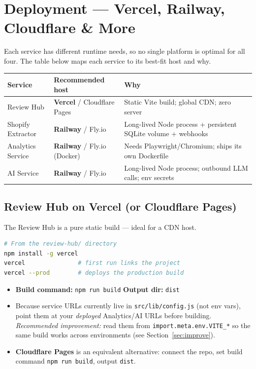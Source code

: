 \documentclass[11pt,a4paper]{article}
\begin{document}
\section{Deployment --- Vercel, Railway, Cloudflare \& More}\label{sec:deploy}

Each service has different runtime needs, so no single platform is optimal for
all four. The table below maps each service to its best-fit host and why.

\begin{center}
\begin{tabularx}{\textwidth}{@{}l l Y@{}}
\toprule
\textbf{Service} & \textbf{Recommended host} & \textbf{Why}\\
\midrule
Review Hub & \textbf{Vercel} / Cloudflare Pages & Static Vite build; global CDN; zero server\\
Shopify Extractor & \textbf{Railway} / Fly.io & Long-lived Node process + persistent SQLite volume + webhooks\\
Analytics Service & \textbf{Railway} / Fly.io (Docker) & Needs Playwright/Chromium; ships its own Dockerfile\\
AI Service & \textbf{Railway} / Fly.io & Long-lived Node process; outbound LLM calls; env secrets\\
\bottomrule
\end{tabularx}
\end{center}

\subsection{Review Hub on Vercel (or Cloudflare Pages)}

The Review Hub is a pure static build --- ideal for a CDN host.

\begin{lstlisting}[language=bash]
# From the review-hub/ directory
npm install -g vercel
vercel               # first run links the project
vercel --prod        # deploys the production build
\end{lstlisting}

\begin{itemize}[leftmargin=1.4em]
  \item \textbf{Build command:} \texttt{npm run build} \quad
  \textbf{Output dir:} \texttt{dist}
  \item Because service URLs currently live in \texttt{src/lib/config.js} (not
  env vars), point them at your \emph{deployed} Analytics/AI URLs before
  building. \emph{Recommended improvement:} read them from \texttt{import.meta.env.VITE\_*}
  so the same build works across environments (see Section~\ref{sec:improve}).
  \item \textbf{Cloudflare Pages} is an equivalent alternative: connect the
  repo, set build command \texttt{npm run build}, output \texttt{dist}.
\end{itemize}
\end{document}
